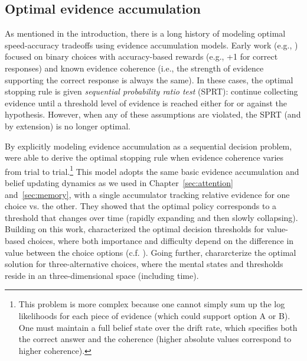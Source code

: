 \subsection{Optimal evidence accumulation}

As mentioned in the introduction, there is a long history of modeling optimal speed-accuracy tradeoffs using evidence accumulation models. Early work (e.g., \citealp{bogacz2006physics,vul2009one}) focused on binary choices with accuracy-based rewards (e.g., +1 for correct responses) and known evidence coherence (i.e., the strength of evidence supporting the correct response is always the same). In these cases, the optimal stopping rule is given \emph{sequential probability ratio test} (SPRT): continue collecting evidence until a threshold level of evidence is reached either for or against the hypothesis. However, when any of these assumptions are violated, the SPRT (and by extension) is no longer optimal.

By explicitly modeling evidence accumulation as a sequential decision problem, \citet{drugowitsch2012cost} were able to derive the optimal stopping rule when evidence coherence varies from trial to trial.\footnote{%
  This problem is more complex because one cannot simply sum up the log likelihoods for each piece of evidence (which could support option A or B). One must maintain a full belief state over the drift rate, which specifies both the correct answer and the coherence (higher absolute values correspond to higher coherence). 
} This model adopts the same basic evidence accumulation and belief updating dynamics as we used in Chapter~\ref{sec:attention} and~\ref{sec:memory}, with a single accumulator tracking relative evidence for one choice vs. the other. They showed that the optimal policy corresponds to a threshold that changes over time (rapidly expanding and then slowly collapsing). Building on this work, \citet{tajima2016optimal} characterized the optimal decision thresholds for value-based choices, where both importance and difficulty depend on the difference in value between the choice options (c.f. \citealp{fudenberg2018speed}). Going further, \citet{tajima2019optimal} chararcterize the optimal solution for three-alternative choices, where the mental states and thresholds reside in an three-dimensional space (including time).

